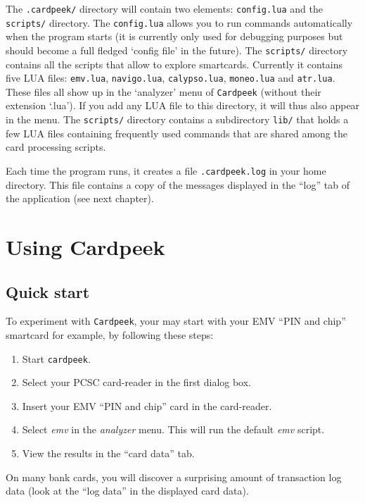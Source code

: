 \documentclass[11pt]{report}
\begin{document}
The \texttt{.cardpeek/} directory will contain two elements: \texttt{config.lua} and the \texttt{scripts/} directory.
The \texttt{config.lua} allows you to run commands automatically when the program starts 
(it is currently only used for debugging purposes but should become a full fledged `config file' in the future).
The \texttt{scripts/} directory contains all the scripts that allow to explore smartcards. 
Currently it contains five LUA files: \texttt{emv.lua}, \texttt{navigo.lua}, \texttt{calypso.lua}, \texttt{moneo.lua} and \texttt{atr.lua}.
These files all show up in the `analyzer' menu of \texttt{Cardpeek} (without their extension `.lua').
If you add any LUA file to this directory, it will thus also appear in the menu.
The \texttt{scripts/} directory contains a subdirectory \texttt{lib/} that holds a few LUA files containing frequently used commands that are shared among the card processing scripts.

Each time the program runs, it creates a file \texttt{.cardpeek.log} in your home directory.
This file contains a copy of the messages displayed in the ``log'' tab of the application (see next chapter). 

\chapter{Using Cardpeek}

\section{Quick start}

To experiment with \texttt{Cardpeek}, your may start with your EMV ``PIN and chip'' smartcard for example, by following these steps:
\begin{enumerate}
\item{Start \texttt{cardpeek}.}
\item{Select your PCSC card-reader in the first dialog box.}
\item{Insert your EMV ``PIN and chip'' card in the card-reader.}
\item{Select \emph{emv} in the \emph{analyzer} menu. This will run the default \emph{emv} script.}
\item{View the results in the ``card data'' tab.}
\end{enumerate}

On many bank cards, you will discover a surprising amount of transaction log data (look at the ``log data'' in the displayed card data).
\end{document}
